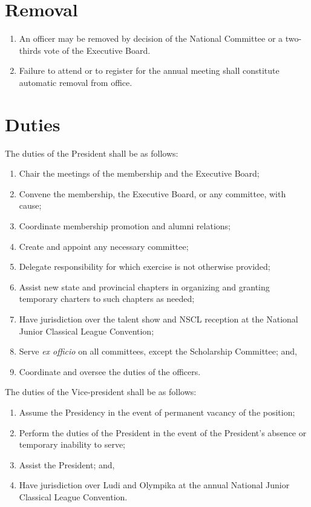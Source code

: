 \documentclass{bylaws}
\newcommand{\NSCL}{\textsc{NSCL}\xspace}
\begin{document}
\begin{linenumbers}[1]
  \section{Removal}
  \begin{enumerate}
  \item An officer may be removed by decision of the National Committee
    or a two-thirds vote of the Executive Board.
  \item Failure to attend or to register for the annual meeting shall
    constitute automatic removal from office.\\
  \end{enumerate}

  \section{Duties} %
  \begin{enumerate}
    \sub[President] The duties of the President shall be as follows:
    \begin{enumerate}
    \item Chair the meetings of the membership and the Executive Board;
    \item Convene the membership, the Executive Board, or any committee,
      with cause;
    \item Coordinate membership promotion and alumni relations;
    \item Create and appoint any necessary committee;
    \item Delegate responsibility for which exercise is not otherwise
      provided;
    \item Assist new state and provincial chapters in organizing and
      granting temporary charters to such chapters as needed;
    \item Have jurisdiction over the talent show and \NSCL reception at
      the National Junior Classical League Convention;
    \item Serve \textit{ex officio} on all committees, except the
      Scholarship Committee; and,
    \item Coordinate and oversee the duties of the officers.
    \end{enumerate}
    
     The duties of the Vice-president shall be as
    follows:
    \begin{enumerate}
    \item Assume the Presidency in the event of permanent vacancy of the
      position;
    \item Perform the duties of the President in the event of the
      President's absence or temporary inability to serve;
    \item Assist the President; and,
    \item Have jurisdiction over Ludi and Olympika at the annual
      National Junior Classical League Convention.
    \end{enumerate}
    

\end{enumerate}
\end{linenumbers}
\end{document}
